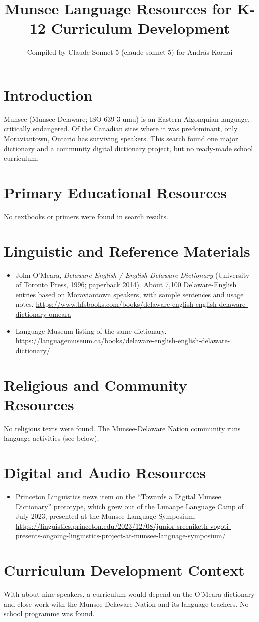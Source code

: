 \documentclass[12pt]{article}
\title{Munsee Language Resources for K-12 Curriculum Development}
\author{Compiled by Claude Sonnet 5 (claude-sonnet-5) for Andr\'as Kornai}
\date{}
\begin{document}
\maketitle
\section{Introduction}
Munsee (Munsee Delaware; ISO 639-3 umu) is an Eastern Algonquian language, critically endangered. Of the Canadian sites where it was predominant, only Moraviantown, Ontario has surviving speakers. This search found one major dictionary and a community digital dictionary project, but no ready-made school curriculum.
\section{Primary Educational Resources}
No textbooks or primers were found in search results.
\section{Linguistic and Reference Materials}
\begin{itemize}
\item John O'Meara, \emph{Delaware-English / English-Delaware Dictionary} (University of Toronto Press, 1996; paperback 2014). About 7,100 Delaware-English entries based on Moraviantown speakers, with sample sentences and usage notes. \url{https://www.hfsbooks.com/books/delaware-english-english-delaware-dictionary-omeara}
\item Language Museum listing of the same dictionary. \url{https://languagemuseum.ca/books/delaware-english-english-delaware-dictionary/}
\end{itemize}
\section{Religious and Community Resources}
No religious texts were found. The Munsee-Delaware Nation community runs language activities (see below).
\section{Digital and Audio Resources}
\begin{itemize}
\item Princeton Linguistics news item on the ``Towards a Digital Munsee Dictionary'' prototype, which grew out of the Lunaape Language Camp of July 2023, presented at the Munsee Language Symposium. \url{https://linguistics.princeton.edu/2023/12/08/junior-sreeniketh-vogoti-presents-ongoing-linguistics-project-at-munsee-language-symposium/}
\end{itemize}
\section{Curriculum Development Context}
With about nine speakers, a curriculum would depend on the O'Meara dictionary and close work with the Munsee-Delaware Nation and its language teachers. No school programme was found.
\end{document}
